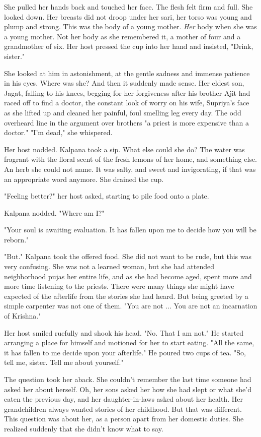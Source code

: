 \documentclass{amsart}
\begin{document}
	She pulled her hands back and touched her face. The flesh felt firm and full.
	She looked down. Her breasts did not droop under her sari, her torso was young
	and plump and strong. This was the body of a young mother. \emph{Her} body when
	she was a young mother. Not her body as she remembered it, a mother of four and
	a grandmother of six. Her host pressed the cup into her hand and insisted,
	"Drink, sister."
	
	She looked at him in astonishment, at the gentle sadness and immense patience in
	his eyes. Where was she? And then it suddenly made sense. Her eldest son, Jagat,
	falling to his knees, begging for her forgiveness after his brother Ajit had
	raced off to find a doctor, the constant look of worry on his wife, Supriya's
	face as she lifted up and cleaned her painful, foul smelling leg every day. The
	odd overheard line in the argument over brothers "a priest is more expensive
	than a doctor." "I'm dead," she whispered.
	
	Her host nodded. Kalpana took a sip. What else could she do? The water was
	fragrant with the floral scent of the fresh lemons of her home, and something
	else. An herb she could not name. It was salty, and sweet and invigorating, if
	that was an appropriate word anymore. She drained the cup.
	
	"Feeling better?" her host asked, starting to pile food onto a plate.
	
	Kalpana nodded. "Where am I?"
	
	"Your soul is awaiting evaluation. It has fallen upon me to decide how you will
	be reborn." 
	
	"But." Kalpana took the offered food. She did not want to be rude, but this was
	very confusing. She was not a learned woman, but she had attended neighborhood
	pujas her entire life, and as she had become aged, spent more and more time
	listening to the priests. There were many things she might have expected of the
	afterlife from the stories she had heard. But being greeted by a simple
	carpenter was not one of them. "You are not ... You are not an incarnation of
	Krishna." 
	
	Her host smiled ruefully and shook his head. "No. That I am not." He started
	arranging a place for himself and motioned for her to start eating. "All the
	same, it has fallen to me decide upon your afterlife." He poured two cups of
	tea. "So, tell me, sister. Tell me about yourself."
	
	The question took her aback. She couldn't remember the last time someone had
	asked her about herself. Oh, her sons asked her how she had slept or what she'd eaten the
	previous day, and her daughter-in-laws asked about her health. Her grandchildren
	always wanted stories of her childhood. But that was different. This question
	was about her, as a person apart from her domestic duties. She realized suddenly
	that she didn't know what to say.
	
\end{document}

